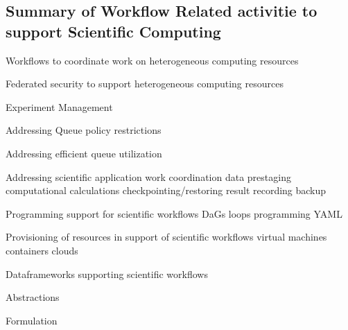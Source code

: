 \documentclass[utf8]{FrontiersinVancouver} %
\begin{document}
\subsection{Summary of Workflow Related activitie to support Scientific Computing}

Workflows to coordinate work on heterogeneous computing resources

Federated security to support heterogeneous computing resources

Experiment Management

Addressing  Queue policy restrictions

Addressing efficient queue utilization

Addressing scientific application work coordination
    data prestaging
    computational calculations
    checkpointing/restoring
    result recording
    backup

Programming support for scientific workflows
    DaGs
    loops
    programming
    YAML
    
Provisioning of resources in support of scientific workflows
    virtual machines
    containers
    clouds

Dataframeworks supporting scientific workflows

Abstractions

Formulation



\end{document}
